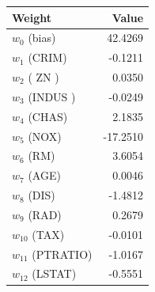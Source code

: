 \begin{tabular}{lr}
\toprule
Weight & Value \\
\midrule
$w_0$ (bias) & 42.4269 \\
$w_{1}$ (CRIM) & -0.1211 \\
$w_{2}$ ( ZN ) & 0.0350 \\
$w_{3}$ (INDUS ) & -0.0249 \\
$w_{4}$ (CHAS) & 2.1835 \\
$w_{5}$ (NOX) & -17.2510 \\
$w_{6}$ (RM) & 3.6054 \\
$w_{7}$ (AGE) & 0.0046 \\
$w_{8}$ (DIS) & -1.4812 \\
$w_{9}$ (RAD) & 0.2679 \\
$w_{10}$ (TAX) & -0.0101 \\
$w_{11}$ (PTRATIO) & -1.0167 \\
$w_{12}$ (LSTAT) & -0.5551 \\
\bottomrule
\end{tabular}
